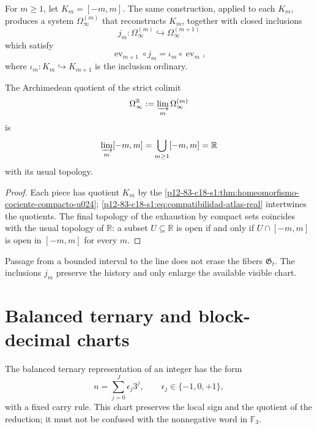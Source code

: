 For \(m\geq1\), let \(K_m=[-m,m]\). The same construction, applied to each
\(K_m\), produces a system \(\Omega_\infty^{(m)}\) that reconstructs
\(K_m\), together with closed inclusions
\begin{equation}
 j_m:\Omega_\infty^{(m)}\hookrightarrow
 \Omega_\infty^{(m+1)}
 \label{p12-83-c18-s1:eq:inclusion-atlas-genealogico}
\end{equation}
which satisfy
\begin{equation}
 \operatorname{ev}_{m+1}\circ j_m
 =\iota_m\circ\operatorname{ev}_m,
 \label{p12-83-c18-s1:eq:compatibilidad-atlas-real}
\end{equation}
where \(\iota_m:K_m\hookrightarrow K_{m+1}\) is the inclusion ordinary.

\begin{proposition}
\label{p12-83-c18-s1:prop:agotamiento-recta-real-u024}
The Archimedean quotient of the strict colimit
\begin{equation}
 \Omega_\infty^{\mathbb R}
 :=\varinjlim_m\Omega_\infty^{(m)}
 \label{p12-83-c18-s1:eq:colimite-historias-recta}
\end{equation}
is
\begin{equation}
 \varinjlim_m[-m,m]
 =\bigcup_{m\geq1}[-m,m]
 =\mathbb R
 \label{p12-83-c18-s1:eq:colimite-compactos-recta}
\end{equation}
with its usual topology.
\end{proposition}

\begin{proof}
Each piece has quotient \(K_m\) by the
\cref{p12-83-c18-s1:thm:homeomorfismo-cociente-compacto-u024};
\eqref{p12-83-c18-s1:eq:compatibilidad-atlas-real} intertwines the quotients. The final topology
of the exhaustion by compact sets coincides with the usual topology of
\(\mathbb R\): a subset \(U\subseteq\mathbb R\) is open if and only
if \(U\cap[-m,m]\) is open in \([-m,m]\) for every \(m\).
\end{proof}

Passage from a bounded interval to the line does not erase the fibers
\(\mathfrak G_t\). The inclusions \(j_m\) preserve the history and only
enlarge the available visible chart.

\section{Balanced ternary and block-decimal charts}

The balanced ternary representation of an integer has the form
\begin{equation}
 n=\sum_{j=0}^{J}\epsilon_j3^j,
 \qquad
 \epsilon_j\in\{-1,0,+1\},
 \label{p12-83-c18-s1:eq:carta-ternaria-balanceada-u024}
\end{equation}
with a fixed carry rule. This chart preserves the local sign and the
quotient of the reduction; it must not be confused with the nonnegative word in
\(\mathbb F_3\).

